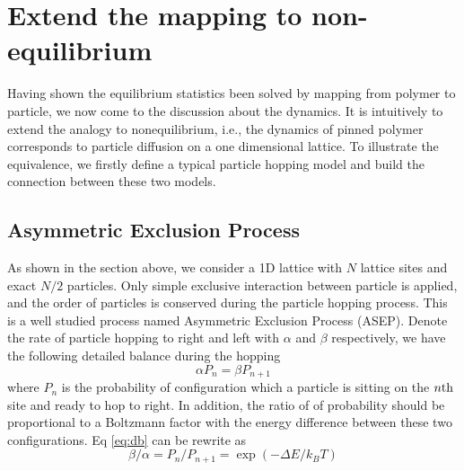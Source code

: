 \documentclass[aps,showpacs,twocolumn,floatfix,prx,superscriptaddress]{revtex4-1}
\begin{document}
\section{Extend the mapping to non-equilibrium}
Having shown the equilibrium statistics been solved by mapping from polymer to
particle, we now come to the discussion about the dynamics. It is intuitively to
extend the analogy to nonequilibrium, i.e., the dynamics of pinned polymer
corresponds to particle diffusion on a one dimensional lattice. To illustrate
the equivalence, we firstly define a typical particle hopping model and build
the connection between these two models. 

\subsection{Asymmetric Exclusion Process}
\label{sec:asep}
As shown in the section above, we consider a 1D lattice with $N$ lattice sites and
exact $N/2$ particles. Only simple exclusive interaction between particle is
applied, and the order of particles is conserved during the particle hopping
process. This is a well studied process named Asymmetric Exclusion Process
(ASEP)\cite{Derrida1998,Schutz2001}. Denote the rate of particle hopping to right and left with
$\alpha$ and $\beta$ respectively, we have the following detailed balance during
the hopping
\begin{equation}
    \alpha P_{n} = \beta P_{n+1} \label{eq:db}
\end{equation}
where $P_{n}$ is the probability of configuration which a particle is sitting
on the $n \rm{th}$ site and ready to hop to right. 
In addition, the ratio of of probability should be proportional to a Boltzmann
factor with the energy difference between these two configurations. Eq
\eqref{eq:db} can be rewrite as 
\begin{equation}
    \beta / \alpha = P_{n} / P_{n+1} = \exp{(-\Delta E / k_B T)}  \label{eq:r_divide_l}
\end{equation}
\end{document}
